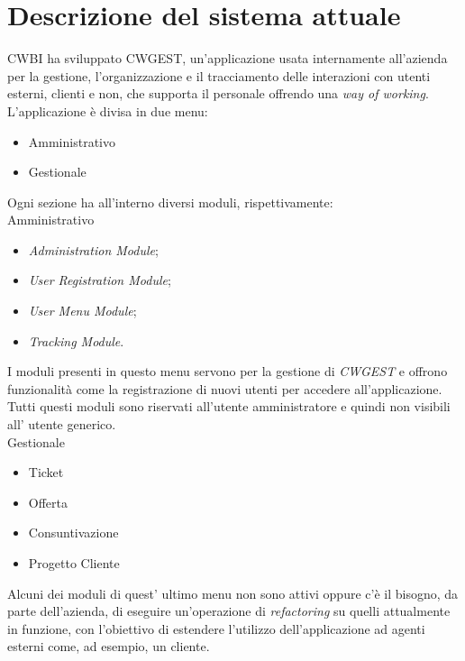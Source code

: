 \chapter{Descrizione del sistema attuale}
CWBI ha sviluppato CWGEST\glsfirstoccur , un'applicazione usata internamente all'azienda per la gestione, l'organizzazione e il tracciamento delle interazioni con utenti esterni, clienti e non, che supporta il personale offrendo una \textit{way of working}. \\
L'applicazione è divisa in due menu:
\begin{itemize}
	\item Amministrativo
	\item Gestionale
\end{itemize}
Ogni sezione ha all'interno diversi moduli, rispettivamente:\\
Amministrativo
\begin{itemize}
\item \textit{Administration Module};
\item \textit{User Registration Module};
\item \textit{User Menu Module};
\item \textit{Tracking Module}.
\end{itemize}
I moduli presenti in questo menu servono per la gestione di \textit{CWGEST} e offrono funzionalità come la registrazione di nuovi utenti per accedere all'applicazione. Tutti questi moduli sono riservati all'utente amministratore e quindi non visibili all' utente generico. \\
Gestionale
\begin{itemize}
\item Ticket 
\item Offerta
\item Consuntivazione
\item Progetto Cliente
\end{itemize}
Alcuni dei moduli di quest' ultimo menu non sono attivi oppure c'è il bisogno, da parte dell'azienda, di eseguire un'operazione di \textit{refactoring\glsfirstoccur}\; su quelli attualmente in funzione, con l'obiettivo di estendere l'utilizzo dell'applicazione ad agenti esterni come, ad esempio, un cliente. 

